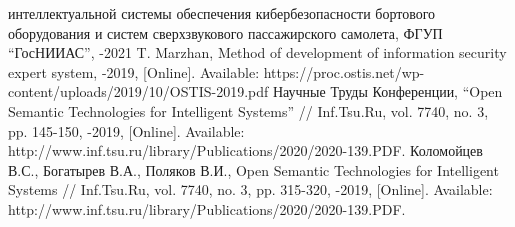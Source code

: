 \begin{thebibliography}{}
интеллектуальной системы обеспечения кибербезопасности бортового оборудования
и систем сверхзвукового пассажирского самолета, ФГУП ``ГосНИИАС'', -2021
T. Marzhan, Method of development of information security expert system, -2019, [Online].
Available: https://proc.ostis.net/wp-content/uploads/2019/10/OSTIS-2019.pdf
Научные Труды Конференции, “Open Semantic Technologies for Intelligent Systems”
// Inf.Tsu.Ru, vol. 7740, no. 3, pp. 145-150, -2019,
[Online]. Available: http://www.inf.tsu.ru/library/Publications/2020/2020-139.PDF.
Коломойцев В.С., Богатырев В.А., Поляков В.И., Open Semantic Technologies for Intelligent Systems
// Inf.Tsu.Ru, vol. 7740, no. 3, pp. 315-320, -2019,
[Online]. Available: http://www.inf.tsu.ru/library/Publications/2020/2020-139.PDF.
\end{thebibliography}


